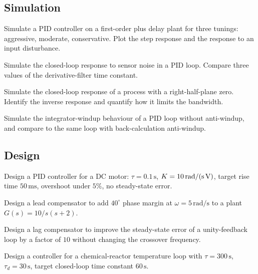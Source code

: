 \subsection*{Simulation}

\begin{exercise}
Simulate a PID controller on a first-order plus delay plant for three tunings: aggressive, moderate, conservative. Plot the step response and the response to an input disturbance.
\end{exercise}

\begin{exercise}
Simulate the closed-loop response to sensor noise in a PID loop. Compare three values of the derivative-filter time constant.
\end{exercise}

\begin{exercise}
Simulate the closed-loop response of a process with a right-half-plane zero. Identify the inverse response and quantify how it limits the bandwidth.
\end{exercise}

\begin{exercise}
Simulate the integrator-windup behaviour of a PID loop without anti-windup, and compare to the same loop with back-calculation anti-windup.
\end{exercise}

\subsection*{Design}

\begin{exercise}
Design a PID controller for a DC motor: $\tau = 0.1\,\text{s}$, $K = 10\,\text{rad/(s\,V)}$, target rise time $50\,\text{ms}$, overshoot under $5\%$, no steady-state error.
\end{exercise}

\begin{exercise}
Design a lead compensator to add $40^\circ$ phase margin at $\omega = 5\,\text{rad/s}$ to a plant $G(s) = 10/s(s+2)$.
\end{exercise}

\begin{exercise}
Design a lag compensator to improve the steady-state error of a unity-feedback loop by a factor of $10$ without changing the crossover frequency.
\end{exercise}

\begin{exercise}
Design a controller for a chemical-reactor temperature loop with $\tau = 300\,\text{s}$, $\tau_d = 30\,\text{s}$, target closed-loop time constant $60\,\text{s}$.
\end{exercise}

